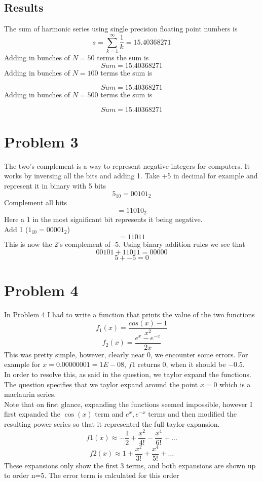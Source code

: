 \documentclass[12pt]{article}
\begin{document}
\subsection*{Results}
The sum of harmonic series using single precision floating point numbers is 
$$ s = \sum_{k=1}^{\infty} \frac{1}{k} = 15.40368271 $$
Adding in bunches of $N=50$ terms the sum is 
$$ Sum = 15.40368271 $$
Adding in bunches of $N=100$ terms the sum is 

$$ Sum = 15.40368271 $$
Adding in bunches of $N=500$ terms the sum is 

$$ Sum = 15.40368271 $$


\section*{Problem 3}
The two's complement is a way to represent negative integers for computers. It works by inversing all the bits and adding 1. 
Take +5 in decimal for example and represent it in binary with 5 bits 
$$ 5_{10} = 00101_{2} $$
Complement all bits 
$$ = 11010_{2} $$
Here a 1 in the most significant bit represents it being negative. 
\\
Add 1 ($1_{10} = 00001_{2}$) 
$$ = 11011 $$
This is now the 2's complement of -5. Using binary addition rules we see that 
$$ 00101 + 11011 = 00000 $$
$$ 5 + -5 = 0 $$ 


\section*{Problem 4}
In Problem 4 I had to write a function that prints the value of the two functions 
$$ f_1 (x) = \frac{cos(x) -1}{x^2} $$
$$ f_2 (x) = \frac{e^x - e^{-x} }{2x} $$
This was pretty simple, however, clearly near 0, we encounter some errors. For example for $x= 0.00000001 = 1E-08$, $f1$ returns 0, when it should be $-0.5$. 
\\
In order to resolve this, as said in the question, we taylor expand the functions. The question specifies that we taylor expand around the point $x=0$ which is a maclaurin series. 
\\
Note that on first glance, expanding the functions seemed impossible, however I first expanded the $\cos(x)$ term and $e^x, e^{-x}$ terms and then modified the resulting power series so that it represented the full taylor expansion. 
$$ f1 (x) \approx - \frac{1}{2} + \frac{x^2}{4!} - \frac{x^4}{6!} + \ldots $$
$$ f2(x) \approx 1 + \frac{x^2}{3!} + \frac{x^4}{5!} + \ldots $$
These expansions only show the first 3 terms, and both expansions are shown up to order n=5. The error term is calculated for this order
\end{document}
